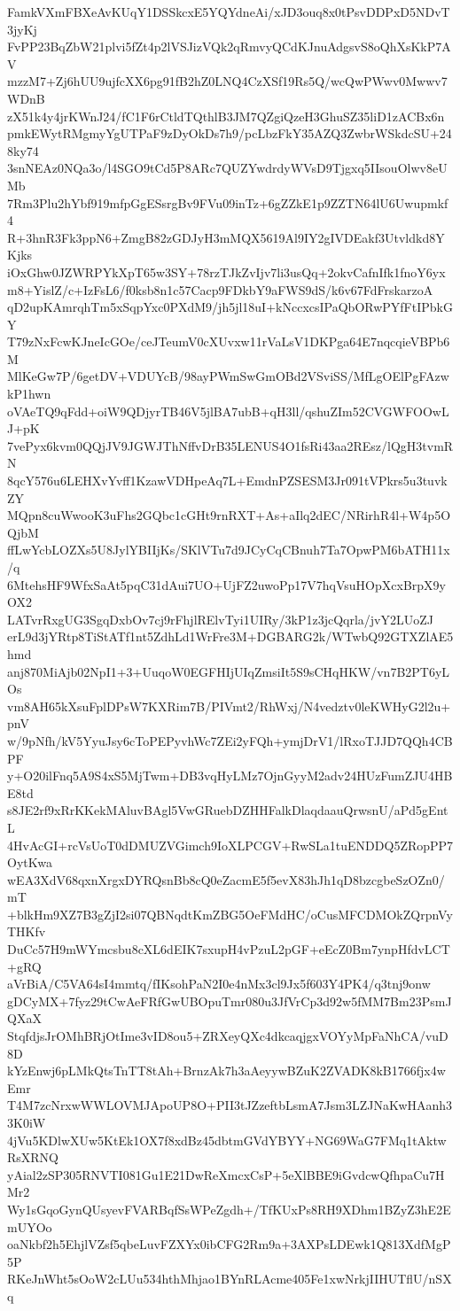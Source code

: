 FamkVXmFBXeAvKUqY1DSSkcxE5YQYdneAi/xJD3ouq8x0tPsvDDPxD5NDvT3jyKj
FvPP23BqZbW21plvi5fZt4p2lVSJizVQk2qRmvyQCdKJnuAdgsvS8oQhXsKkP7AV
mzzM7+Zj6hUU9ujfcXX6pg91fB2hZ0LNQ4CzXSf19Rs5Q/wcQwPWwv0Mwwv7WDnB
zX51k4y4jrKWnJ24/fC1F6rCtldTQthlB3JM7QZgiQzeH3GhuSZ35liD1zACBx6n
pmkEWytRMgmyYgUTPaF9zDyOkDs7h9/pcLbzFkY35AZQ3ZwbrWSkdcSU+248ky74
3snNEAz0NQa3o/l4SGO9tCd5P8ARc7QUZYwdrdyWVsD9Tjgxq5IIsouOlwv8eUMb
7Rm3Plu2hYbf919mfpGgESsrgBv9FVu09inTz+6gZZkE1p9ZZTN64lU6Uwupmkf4
R+3hnR3Fk3ppN6+ZmgB82zGDJyH3mMQX5619Al9IY2gIVDEakf3Utvldkd8YKjks
iOxGhw0JZWRPYkXpT65w3SY+78rzTJkZvIjv7li3usQq+2okvCafnIfk1fnoY6yx
m8+YislZ/c+IzFsL6/f0ksb8n1c57Cacp9FDkbY9aFWS9dS/k6v67FdFrskarzoA
qD2upKAmrqhTm5xSqpYxc0PXdM9/jh5jl18uI+kNccxcsIPaQbORwPYfFtIPbkGY
T79zNxFcwKJneIcGOe/ceJTeumV0cXUvxw11rVaLsV1DKPga64E7nqcqieVBPb6M
MlKeGw7P/6getDV+VDUYcB/98ayPWmSwGmOBd2VSviSS/MfLgOElPgFAzwkP1hwn
oVAeTQ9qFdd+oiW9QDjyrTB46V5jlBA7ubB+qH3ll/qshuZIm52CVGWFOOwLJ+pK
7vePyx6kvm0QQjJV9JGWJThNffvDrB35LENUS4O1fsRi43aa2REsz/lQgH3tvmRN
8qcY576u6LEHXvYvff1KzawVDHpeAq7L+EmdnPZSESM3Jr091tVPkrs5u3tuvkZY
MQpn8cuWwooK3uFhs2GQbc1cGHt9rnRXT+As+aIlq2dEC/NRirhR4l+W4p5OQjbM
ffLwYcbLOZXs5U8JylYBIIjKs/SKlVTu7d9JCyCqCBnuh7Ta7OpwPM6bATH11x/q
6MtehsHF9WfxSaAt5pqC31dAui7UO+UjFZ2uwoPp17V7hqVsuHOpXcxBrpX9yOX2
LATvrRxgUG3SgqDxbOv7cj9rFhjlRElvTyi1UIRy/3kP1z3jcQqrla/jvY2LUoZJ
erL9d3jYRtp8TiStATf1nt5ZdhLd1WrFre3M+DGBARG2k/WTwbQ92GTXZlAE5hmd
anj870MiAjb02NpI1+3+UuqoW0EGFHIjUIqZmsiIt5S9sCHqHKW/vn7B2PT6yLOs
vm8AH65kXsuFplDPsW7KXRim7B/PIVmt2/RhWxj/N4vedztv0leKWHyG2l2u+pnV
w/9pNfh/kV5YyuJsy6cToPEPyvhWc7ZEi2yFQh+ymjDrV1/lRxoTJJD7QQh4CBPF
y+O20ilFnq5A9S4xS5MjTwm+DB3vqHyLMz7OjnGyyM2adv24HUzFumZJU4HBE8td
s8JE2rf9xRrKKekMAluvBAgl5VwGRuebDZHHFalkDlaqdaauQrwsnU/aPd5gEntL
4HvAcGI+rcVsUoT0dDMUZVGimch9IoXLPCGV+RwSLa1tuENDDQ5ZRopPP7OytKwa
wEA3XdV68qxnXrgxDYRQsnBb8cQ0eZacmE5f5evX83hJh1qD8bzcgbeSzOZn0/mT
+blkHm9XZ7B3gZjI2si07QBNqdtKmZBG5OeFMdHC/oCusMFCDMOkZQrpnVyTHKfv
DuCc57H9mWYmcsbu8cXL6dEIK7sxupH4vPzuL2pGF+eEcZ0Bm7ynpHfdvLCT+gRQ
aVrBiA/C5VA64sI4mmtq/fIKsohPaN2I0e4nMx3cl9Jx5f603Y4PK4/q3tnj9onw
gDCyMX+7fyz29tCwAeFRfGwUBOpuTmr080u3JfVrCp3d92w5fMM7Bm23PsmJQXaX
StqfdjsJrOMhBRjOtIme3vID8ou5+ZRXeyQXc4dkcaqjgxVOYyMpFaNhCA/vuD8D
kYzEnwj6pLMkQtsTnTT8tAh+BrnzAk7h3aAeyywBZuK2ZVADK8kB1766fjx4wEmr
T4M7zcNrxwWWLOVMJApoUP8O+PII3tJZzeftbLsmA7Jsm3LZJNaKwHAanh33K0iW
4jVu5KDlwXUw5KtEk1OX7f8xdBz45dbtmGVdYBYY+NG69WaG7FMq1tAktwRsXRNQ
yAial2zSP305RNVTI081Gu1E21DwReXmcxCsP+5eXlBBE9iGvdcwQfhpaCu7HMr2
Wy1sGqoGynQUsyevFVARBqfSsWPeZgdh+/TfKUxPs8RH9XDhm1BZyZ3hE2EmUYOo
oaNkbf2h5EhjlVZsf5qbeLuvFZXYx0ibCFG2Rm9a+3AXPsLDEwk1Q813XdfMgP5P
RKeJnWht5sOoW2cLUu534hthMhjao1BYnRLAcme405Fe1xwNrkjIIHUTflU/nSXq
